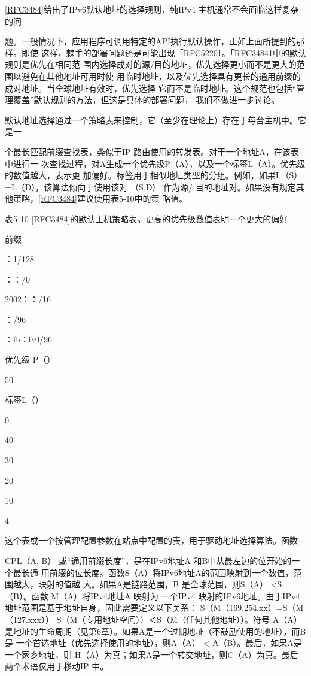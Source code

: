 \href{https://www.rfc-editor.org/rfc/rfc3484}{[RFC3484]}给出了IPv6默认地址的选择规则，纯IPv4 主机通常不会面临这样复杂的问

题。一般情况下，应用程序可调用特定的API执行默认操作，正如上面所提到的那样。即使
这样，棘手的部署问题还是可能出现「RFC52201。「RFC34841中的默认规则是优先在相同范
围内选择成对的源/目的地址，优先选择更小而不是更大的范围以避免在其他地址可用时使
用临时地址，以及优先选择具有更长的通用前缀的成对地址。当全球地址有效时，优先选择
它而不是临时地址。这个规范也包括“管理覆盖”默认规则的方法，但这是具体的部署问题，
我们不做进一步讨论。

默认地址选择通过一个策略表来控制，它（至少在理论上）存在于每台主机中。它是一

个最长匹配前缀查找表，类似于IP 路由使用的转发表。对于一个地址A，在该表中进行一
次查找过程，对A生成一个优先级P（A），以及一个标签L（A）。优先级的数值越大，表示更
加偏好。标签用于相似地址类型的分组。例如，如果L（S） =L（D），该算法倾向于使用该对
（S,D） 作为源/ 目的地址对。如果没有规定其他策略，\href{https://www.rfc-editor.org/rfc/rfc3484}{[RFC3484]}建议使用表5-10中的策
略值。

表5-10 \href{https://www.rfc-editor.org/rfc/rfc3484}{[RFC3484]}的默认主机策略表。更高的优先级数值表明一个更大的偏好

前缀

：1/128

：：/0

2002：：/16

：/96

：fh：0:0/96

优先级 P（）

50

标签L（）

0

40

30

20

10

4

这个表或一个按管理配置参数在站点中配置的表，用于驱动地址选择算法。函数

CPL（A, B） 或“通用前缀长度”，是在IPv6地址A 和B中从最左边的位开始的一个最长通
用前缀的位长度。函数S（A）将IPv6地址A的范围映射到一个数值，范围越大，映射的值越
大。如果A是链路范围，B 是全球范围，则S（A） <S（B）。函数 M（A）将IPv4地址A 映射为
一个IPv4 映射的IPv6地址。由于IPv4地址范围是基于地址自身，因此需要定义以下关系：
S（M（169.254.xx）=S（M（127.xxx）） S（M（专用地址空间））＜S（M（任何其他地址））。符号
A（A）是地址的生命周期（见第6章）。如果A是一个过期地址（不鼓励使用的地址），而B是
一个首选地址（优先选择使用的地址），则A（A） < A（B）。最后，如果A是一个家乡地址，则
H（A）为真；如果A是一个转交地址，则C（A）为真。最后两个术语仅用于移动IP 中。

